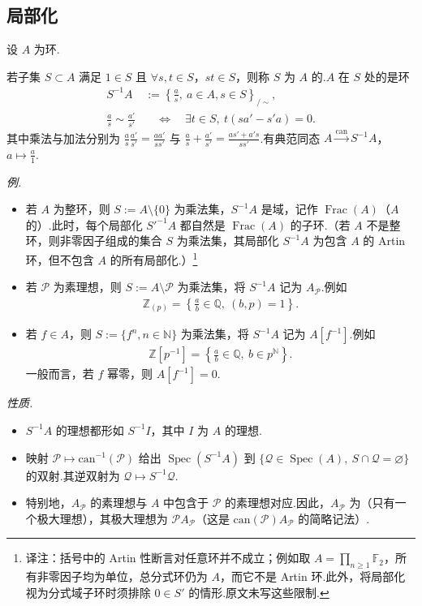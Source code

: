 \subsection{局部化}\label{sec:nt-2-1-3}
设 $A$ 为环.
\begin{definition*}
若子集 $S\subset A$ 满足 $1\in S$ 且 $\forall s,t\in S$，$st\in S$，则称 $S$ 为 $A$ 的.$A$ 在 $S$ 处的是环
\begin{align*}
S^{-1}A&:=\left\{\frac as,\ a\in A,s\in S\right\}_{/\sim},\\
\frac as\sim\frac{a'}{s'}&\quad\Longleftrightarrow\quad\exists t\in S,\ t(sa'-s'a)=0.
\end{align*}
其中乘法与加法分别为 $\frac as\frac{a'}{s'}=\frac{aa'}{ss'}$ 与 $\frac as+\frac{a'}{s'}=\frac{as'+a's}{ss'}$.有典范同态 $A\xrightarrow{\mathrm{can}}S^{-1}A$，$a\mapsto\frac a1$.
\end{definition*}
\emph{例.}
\begin{itemize}
\item 若 $A$ 为整环，则 $S:=A\setminus\{0\}$ 为乘法集，$S^{-1}A$ 是域，记作 $\operatorname{Frac}(A)$（$A$ 的）.此时，每个局部化 $S'^{-1}A$ 都自然是 $\operatorname{Frac}(A)$ 的子环.（若 $A$ 不是整环，则非零因子组成的集合 $S$ 为乘法集，其局部化 $S^{-1}A$ 为包含 $A$ 的 Artin 环，但不包含 $A$ 的所有局部化.）\footnote{译注：括号中的 Artin 性断言对任意环并不成立；例如取 $A=\prod_{n\ge1}\mathbb F_2$，所有非零因子均为单位，总分式环仍为 $A$，而它不是 Artin 环.此外，将局部化视为分式域子环时须排除 $0\in S'$ 的情形.原文未写这些限制.}
\item 若 $\mathcal P$ 为素理想，则 $S:=A\setminus\mathcal P$ 为乘法集，将 $S^{-1}A$ 记为 $A_{\mathcal P}$.例如
\begin{align*}
\mathbb Z_{(p)}=\left\{\frac ab\in\mathbb Q,\ (b,p)=1\right\}.
\end{align*}
\item 若 $f\in A$，则 $S:=\{f^n,n\in\mathbb N\}$ 为乘法集，将 $S^{-1}A$ 记为 $A[f^{-1}]$.例如
\begin{align*}
\mathbb Z[p^{-1}]=\left\{\frac ab\in\mathbb Q,\ b\in p^{\mathbb N}\right\}.
\end{align*}
一般而言，若 $f$ 幂零，则 $A[f^{-1}]=0$.
\end{itemize}
\emph{性质.}
\begin{itemize}
\item $S^{-1}A$ 的理想都形如 $S^{-1}I$，其中 $I$ 为 $A$ 的理想.
\item 映射 $\mathcal P\mapsto\mathrm{can}^{-1}(\mathcal P)$ 给出 $\operatorname{Spec}(S^{-1}A)$ 到 $\{\mathcal Q\in\operatorname{Spec}(A),\ S\cap\mathcal Q=\varnothing\}$ 的双射.其逆双射为 $\mathcal Q\mapsto S^{-1}\mathcal Q$.
\item 特别地，$A_{\mathcal P}$ 的素理想与 $A$ 中包含于 $\mathcal P$ 的素理想对应.因此，$A_{\mathcal P}$ 为（只有一个极大理想），其极大理想为 $\mathcal PA_{\mathcal P}$（这是 $\mathrm{can}(\mathcal P)A_{\mathcal P}$ 的简略记法）.
\end{itemize}

